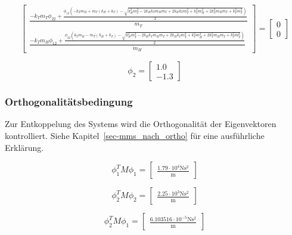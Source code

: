 \documentclass[
  letterpaper,
  DIV=11]{scrreprt}
\begin{document}
\begin{equation}\left[\begin{matrix}\frac{- k_{T} m_{T} \phi_{22} + \frac{\phi_{12} \left(- k_{T} m_{H} + m_{T} \left(k_{H} + k_{T}\right) - \sqrt{k_{H}^{2} m_{T}^{2} - 2 k_{H} k_{T} m_{H} m_{T} + 2 k_{H} k_{T} m_{T}^{2} + k_{T}^{2} m_{H}^{2} + 2 k_{T}^{2} m_{H} m_{T} + k_{T}^{2} m_{T}^{2}}\right)}{2}}{m_{T}}\\\frac{- k_{T} m_{H} \phi_{12} + \frac{\phi_{22} \left(k_{T} m_{H} - m_{T} \left(k_{H} + k_{T}\right) - \sqrt{k_{H}^{2} m_{T}^{2} - 2 k_{H} k_{T} m_{H} m_{T} + 2 k_{H} k_{T} m_{T}^{2} + k_{T}^{2} m_{H}^{2} + 2 k_{T}^{2} m_{H} m_{T} + k_{T}^{2} m_{T}^{2}}\right)}{2}}{m_{H}}\end{matrix}\right] = \left[\begin{matrix}0\\0\end{matrix}\right]\end{equation}

\begin{equation}\phi_{2} = \left[\begin{matrix}1.0\\-1.3\end{matrix}\right]\end{equation}

\hypertarget{orthogonalituxe4tsbedingung-1}{%
\subsubsection{Orthogonalitätsbedingung}\label{orthogonalituxe4tsbedingung-1}}

Zur Entkoppelung des Systems wird die Orthogonalität der Eigenvektoren
kontrolliert. Siehe Kapitel~\ref{sec-mms_nach_ortho} für eine
ausführliche Erklärung.

\begin{equation}\phi_{1}^{T} M \phi_{1} = \left[\begin{matrix}\frac{1.79 \cdot 10^{4} \text{N} \text{s}^{2}}{\text{m}}\end{matrix}\right]\end{equation}

\begin{equation}\phi_{2}^{T} M \phi_{2} = \left[\begin{matrix}\frac{2.25 \cdot 10^{3} \text{N} \text{s}^{2}}{\text{m}}\end{matrix}\right]\end{equation}

\begin{equation}\phi_{2}^{T} M \phi_{1} = \left[\begin{matrix}\frac{6.103516 \cdot 10^{-5} \text{N} \text{s}^{2}}{\text{m}}\end{matrix}\right]\end{equation}
\end{document}
